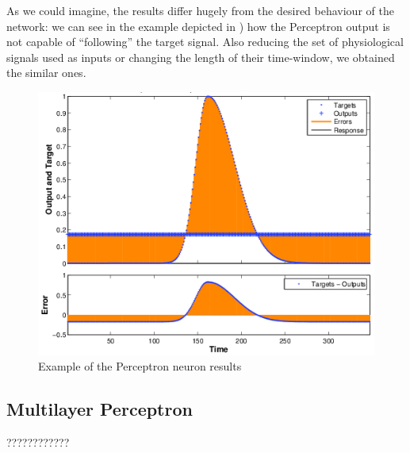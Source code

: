 As we could imagine, the results differ hugely from the desired behaviour of the network: we can see in the example depicted in ) how the Perceptron output is not capable of ``following'' the target signal.
Also reducing the set of physiological signals used as inputs or changing the length of their time-window, we obtained the similar ones.
\begin{figure}[!ht]
\centering
\includegraphics[width=0.7\columnwidth]{images/results/perceptronResults}
\caption{Example of the Perceptron neuron results}
\label{fig:perceptronResults}
\end{figure}


\subsection{Multilayer Perceptron}
\label{subsec:mlpapplication}
????????????


